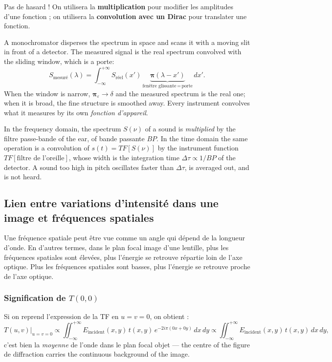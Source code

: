 \begin{conclusion}
  Pas de hasard ! On utilisera la \textbf{multiplication} pour modifier les
  amplitudes d'une fonction ; on utilisera la \textbf{convolution avec un Dirac}
  pour translater une fonction.
\end{conclusion}

\begin{example}
  A monochromator disperses the spectrum in space and scans it with a moving slit
  in front of a detector. The measured signal is the real spectrum convolved with
  the sliding window, which is a porte:
  \[
    S_{\text{mesuré}}(\lambda) = \int_{-\infty}^{+\infty}
      S_{\text{réel}}(x')\, \underbrace{\bm{\pi}(\lambda - x')}
      _{\text{fenêtre glissante} \,=\, \text{porte}}\, dx' .
  \]
  When the window is narrow, $\bm{\pi}_\varepsilon \to \delta$ and the measured
  spectrum is the real one; when it is broad, the fine structure is smoothed away.
  Every instrument convolves what it measures by its own \textit{fonction
  d'appareil}.
\end{example}

\begin{example}
  In the frequency domain, the spectrum $S(\nu)$ of a sound is \emph{multiplied}
  by the filtre passe-bande of the ear, of bande passante $BP$. In the time
  domain the same operation is a convolution of $s(t) = TF[S(\nu)]$ by the instrument
  function $TF[\text{filtre de l'oreille}]$, whose width is the integration time
  $\Delta\tau \propto 1/BP$ of the detector. A sound too high in pitch oscillates
  faster than $\Delta\tau$, is averaged out, and is not heard.
\end{example}

\subsection{Lien entre variations d'intensité dans une image et fréquences spatiales}
Une fréquence spatiale peut être vue comme un angle qui dépend de la longueur
d'onde. En d'autres termes, dans le plan focal image d'une lentille, plus les
fréquences spatiales sont élevées, plus l'énergie se retrouve répartie loin de
l'axe optique. Plus les fréquences spatiales sont basses, plus l'énergie se
retrouve proche de l'axe optique.

\subsubsection{Signification de $T(0,0)$}
Si on reprend l'expression de la TF en $u = v = 0$, on obtient :
\begin{equation*}
  T(u,v)\big|_{u=v=0} \propto \iint_{-\infty}^{+\infty}
    E_{\text{incident}}(x,y)\, t(x,y)\, e^{-2i\pi(0x+0y)}\, dx\, dy
  \propto \iint_{-\infty}^{+\infty} E_{\text{incident}}(x,y)\, t(x,y)\, dx\, dy ,
\end{equation*}
c'est bien la \emph{moyenne} de l'onde dans le plan focal objet --- the centre
of the figure de diffraction carries the continuous background of the image.

